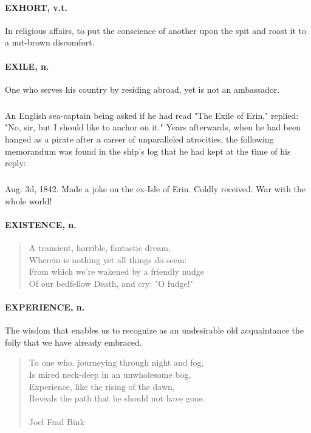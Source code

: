 \documentclass[11pt]{article}
\begin{document}
\paragraph{EXHORT, v.t.} In religious affairs, to put the conscience of another
upon the spit and roast it to a nut-brown discomfort.

\paragraph{EXILE, n.}  One who serves his country by residing abroad, yet is not
an ambassador.
\subparagraph{}   An English sea-captain being asked if he had read "The Exile of
Erin," replied:  "No, sir, but I should like to anchor on it."  Years 
afterwards, when he had been hanged as a pirate after a career of
unparalleled atrocities, the following memorandum was found in the
ship's log that he had kept at the time of his reply:

\subparagraph{}   Aug. 3d, 1842.  Made a joke on the ex-Isle of Erin.  Coldly
  received.  War with the whole world!

\paragraph{EXISTENCE, n.}

\begin{quote}   A transient, horrible, fantastic dream, \\
  Wherein is nothing yet all things do seem: \\
  From which we're wakened by a friendly nudge \\
  Of our bedfellow Death, and cry:  "O fudge!"  \end{quote}

\paragraph{EXPERIENCE, n.}  The wisdom that enables us to recognize as an
undesirable old acquaintance the folly that we have already embraced.

\begin{quote}   To one who, journeying through night and fog, \\
  Is mired neck-deep in an unwholesome bog, \\
  Experience, like the rising of the dawn, \\
  Reveals the path that he should not have gone. \\
 \\
Joel Frad Bink \end{quote}
\end{document}
